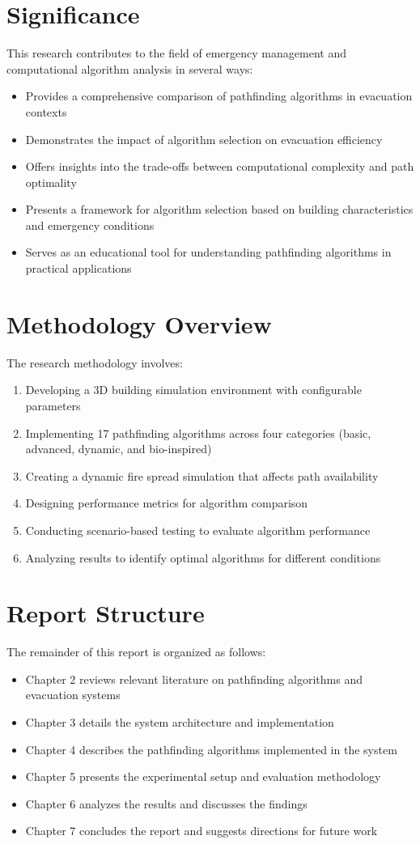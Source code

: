\documentclass[11pt,a4paper]{report}
\begin{document}
\section{Significance}
This research contributes to the field of emergency management and computational algorithm analysis in several ways:
\begin{itemize}
    \item Provides a comprehensive comparison of pathfinding algorithms in evacuation contexts
    \item Demonstrates the impact of algorithm selection on evacuation efficiency
    \item Offers insights into the trade-offs between computational complexity and path optimality
    \item Presents a framework for algorithm selection based on building characteristics and emergency conditions
    \item Serves as an educational tool for understanding pathfinding algorithms in practical applications
\end{itemize}

\section{Methodology Overview}
The research methodology involves:
\begin{enumerate}
    \item Developing a 3D building simulation environment with configurable parameters
    \item Implementing 17 pathfinding algorithms across four categories (basic, advanced, dynamic, and bio-inspired)
    \item Creating a dynamic fire spread simulation that affects path availability
    \item Designing performance metrics for algorithm comparison
    \item Conducting scenario-based testing to evaluate algorithm performance
    \item Analyzing results to identify optimal algorithms for different conditions
\end{enumerate}

\section{Report Structure}
The remainder of this report is organized as follows:
\begin{itemize}
    \item Chapter 2 reviews relevant literature on pathfinding algorithms and evacuation systems
    \item Chapter 3 details the system architecture and implementation
    \item Chapter 4 describes the pathfinding algorithms implemented in the system
    \item Chapter 5 presents the experimental setup and evaluation methodology
    \item Chapter 6 analyzes the results and discusses the findings
    \item Chapter 7 concludes the report and suggests directions for future work
\end{itemize}
\end{document}

